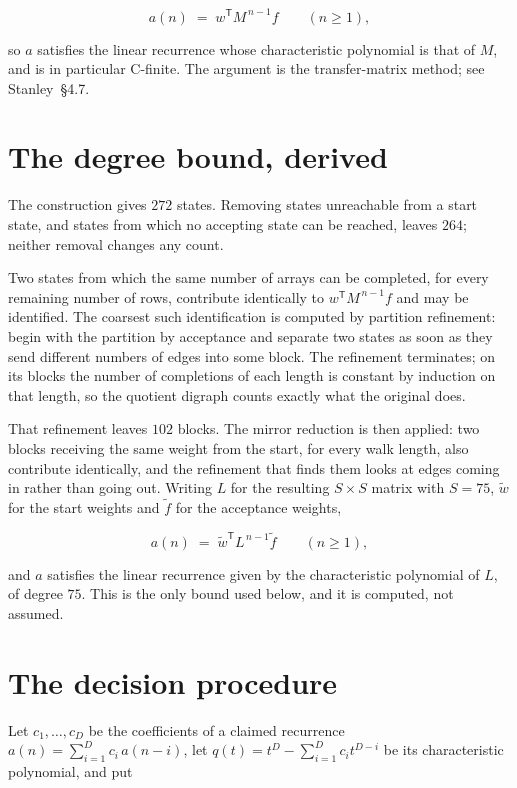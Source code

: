 \documentclass[11pt]{article}
\theoremstyle{definition}
\begin{document}
\[a(n) \;=\; w^{\mathsf T} M^{\,n-1} f \qquad (n \ge 1),\]

so $a$ satisfies the linear recurrence whose characteristic polynomial is that of $M$, and is in particular C-finite. The argument is the transfer-matrix method; see Stanley~\S4.7.

\section{The degree bound, derived}

The construction gives $272$ states. Removing states unreachable from a start state, and states from which no accepting state can be reached, leaves $264$; neither removal changes any count.

Two states from which the same number of arrays can be completed, for every remaining number of rows, contribute identically to $w^{\mathsf T}M^{\,n-1}f$ and may be identified. The coarsest such identification is computed by partition refinement: begin with the partition by acceptance and separate two states as soon as they send different numbers of edges into some block. The refinement terminates; on its blocks the number of completions of each length is constant by induction on that length, so the quotient digraph counts exactly what the original does.

That refinement leaves $102$ blocks. The mirror reduction is then applied: two blocks receiving the same weight from the start, for every walk length, also contribute identically, and the refinement that finds them looks at edges coming in rather than going out. Writing $L$ for the resulting $S \times S$ matrix with $S = 75$, $\tilde w$ for the start weights and $\tilde f$ for the acceptance weights,

\[a(n) \;=\; \tilde w^{\mathsf T} L^{\,n-1} \tilde f \qquad (n \ge 1),\]

and $a$ satisfies the linear recurrence given by the characteristic polynomial of $L$, of degree $75$. This is the only bound used below, and it is computed, not assumed.

\section{The decision procedure}

Let $c_1,\dots,c_D$ be the coefficients of a claimed recurrence $a(n) = \sum_{i=1}^{D} c_i\,a(n-i)$, let $q(t) = t^{D} - \sum_{i=1}^{D} c_i t^{D-i}$ be its characteristic polynomial, and put
\end{document}
